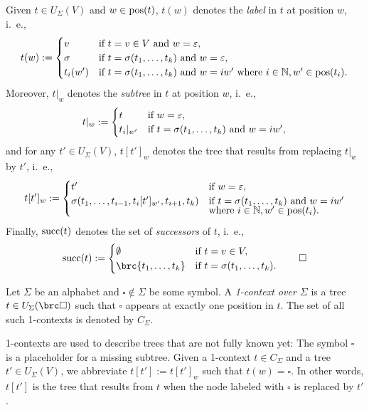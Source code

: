 \begin{definition}
 Given $t\in U_\Sigma(V)$ and $w\in\operatorname{pos}(t)$, $t(w)$ denotes the \emph{label} in $t$ at position $w$, i.~e.,
 \[
  t(w) := \begin{cases}
   v & \text{if } t = v\in V \text{ and } w=\varepsilon, \\
   \sigma & \text{if } t = \sigma(t_1,\ldots,t_k) \text{ and } w = \varepsilon, \\
   t_i(w') & \text{if } t = \sigma(t_1,\ldots,t_k) \text{ and } w = iw' \text{ where } i\in\mathbb N, w'\in\operatorname{pos}(t_i).
  \end{cases}
 \]
 Moreover, $t|_w$ denotes the \emph{subtree} in $t$ at position $w$, i.~e.,
 \[
  t|_w := \begin{cases}
   t & \text{if } w = \varepsilon, \\
   t_i|_{w'} & \text{if } t = \sigma(t_1,\ldots,t_k) \text{ and } w = iw',
  \end{cases}
 \]
 and for any $t'\in U_\Sigma(V)$, $t[t']_w$ denotes the tree that results from replacing $t|_w$ by $t'$, i.~e.,
 \[
  t[t']_w := \begin{cases}
   t' & \text{if } w = \varepsilon, \\
   \sigma(t_1,\ldots,t_{i-1},t_i[t']_{w'},t_{i+1},t_k) & \text{if } t = \sigma(t_1,\ldots,t_k) \text{ and } w = iw' \\[-0.5em] & \text{where } i\in\mathbb N, w'\in\operatorname{pos}(t_i).
  \end{cases}
 \]
 Finally, $\operatorname{succ}(t)$ denotes the set of \emph{successors} of $t$, i.~e.,
 \[
  \osucc(t) := \begin{cases}
   \emptyset & \text{if } t = v\in V, \\
   \brc{t_1,\ldots,t_k} & \text{if } t = \sigma(t_1,\ldots,t_k).
  \end{cases}
  \qedhere
 \]
\end{definition}

\begin{definition}
 Let $\Sigma$ be an alphabet and $\square\notin\Sigma$ be some symbol. A
 \emph{1-context over $\Sigma$} is a tree $t\in U_\Sigma(\brc\square)$ such
 that $\square$ appears at exactly one position in $t$. The set of all such
 1-contexts is denoted by $C_\Sigma$.
\end{definition}

1-contexts are used to describe trees that are not fully known yet: The
symbol $\square$ is a placeholder for a missing subtree. Given a 1-context
$t\in C_\Sigma$ and a tree $t'\in U_\Sigma(V)$, we abbreviate $t[t'] :=
t[t']_w$ such that $t(w) = \square$. In other words, $t[t']$ is the tree that
results from $t$ when the node labeled with $\square$ is replaced by $t'$.

